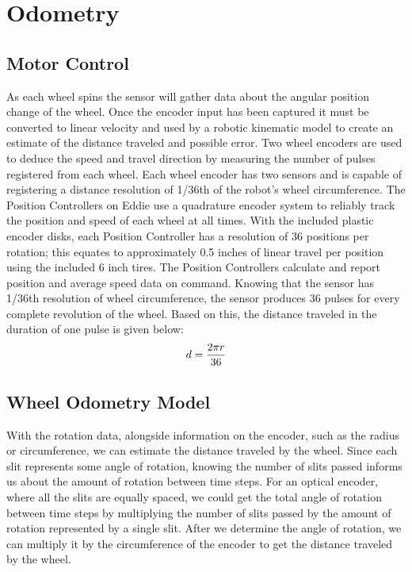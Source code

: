 \section{Odometry}
\subsection{Motor Control}
As each wheel spins the sensor will gather data about the angular position change of the wheel. Once the encoder input has been captured it must be converted to linear velocity and used by a robotic kinematic model to create an estimate of the distance traveled and possible error.
Two wheel encoders are used to deduce the speed and travel direction by measuring the number of pulses registered from each wheel. Each wheel encoder has two sensors and is capable of
registering a distance resolution of 1/36th of the robot’s wheel circumference.
The Position Controllers on Eddie use a quadrature encoder system to reliably track the position and speed of each wheel at all times. With the included plastic encoder disks, each Position Controller has a resolution of 36 positions per rotation; this equates to approximately 0.5 inches of linear travel per position using the included 6 inch tires. 
The Position Controllers calculate and report position and average speed data on command.
Knowing that the sensor has 1/36th resolution of wheel circumference, the sensor produces 36 pulses for every complete revolution of the wheel. Based on this, the distance traveled
in the duration of one pulse is given below:
\begin{equation}\label{eq:1}
    d=\frac{2\pi r}{36} \\
\end{equation}

\subsection{Wheel Odometry Model}
With the rotation data, alongside information on the encoder, such as the radius or circumference, we can estimate the distance traveled by the wheel. Since each slit represents some angle of rotation, knowing the number of slits passed informs us about the amount of rotation between time steps. For an optical encoder, where all the slits are equally spaced, we could get the total angle of rotation between time steps by multiplying the number of slits passed by the amount of rotation represented by a single slit. After we determine the angle of rotation, we can multiply it by the circumference of the encoder to get the distance traveled by the wheel.

